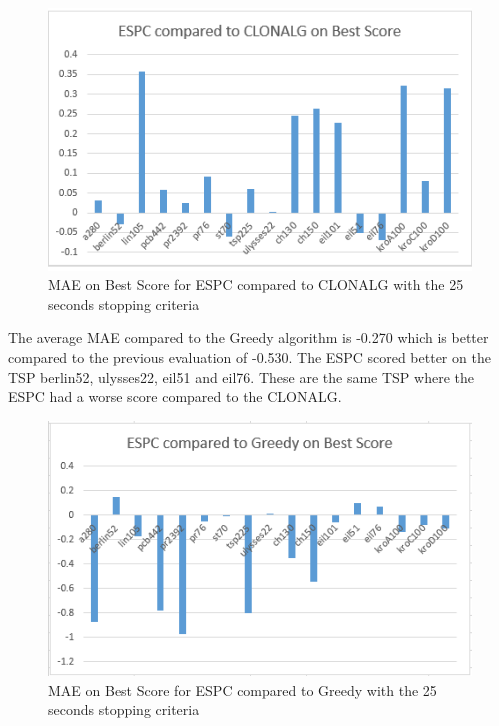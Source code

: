\begin{figure}[H]
	\includegraphics[]{Images/ESPC_Time.png}
	\caption{MAE on Best Score for ESPC compared to CLONALG with the 25 seconds stopping criteria}
	\label{ESPC_Time}
\end{figure}
The average MAE compared to the Greedy algorithm is -0.270 which is better compared to the previous evaluation of -0.530. The ESPC scored better on the TSP berlin52, ulysses22, eil51 and eil76. These are the same TSP where the ESPC had a worse score compared to the CLONALG.
\begin{figure}[H]
	\includegraphics[]{Images/ESPC_Greedy_Time.png}
	\caption{MAE on Best Score for ESPC compared to Greedy with the 25 seconds stopping criteria}
	\label{ESPC_GREEDY_TIME}
\end{figure}
\newpage
